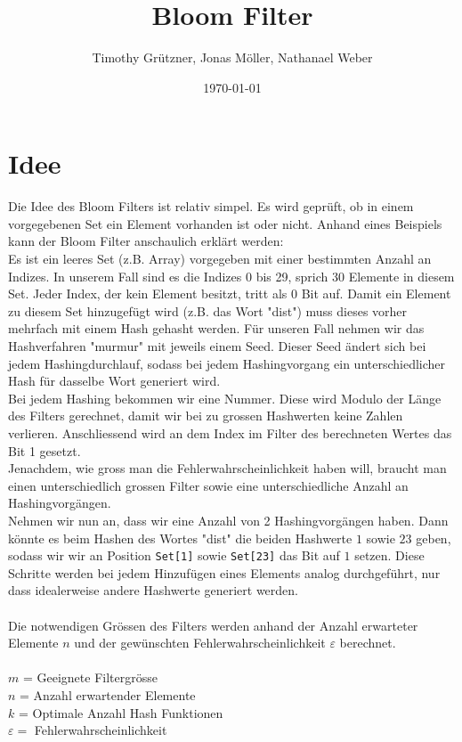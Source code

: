 \documentclass{article}
\title{Bloom Filter}
\author{Timothy Grützner, Jonas Möller, Nathanael Weber }
\date{\today}
\begin{document}
    \maketitle
    \newpage


    \section{Idee}
    Die Idee des Bloom Filters ist relativ simpel. Es wird geprüft, ob in einem vorgegebenen Set ein Element vorhanden ist oder nicht. Anhand eines Beispiels kann der Bloom Filter anschaulich erklärt werden:\\ Es ist ein leeres Set (z.B. Array) vorgegeben mit einer bestimmten Anzahl an Indizes. In unserem Fall sind es die Indizes 0 bis 29, sprich 30 Elemente in diesem Set. Jeder Index, der kein Element besitzt, tritt als 0 Bit auf.
    Damit ein Element zu diesem Set hinzugefügt wird (z.B. das Wort "dist") muss dieses vorher mehrfach mit einem Hash gehasht werden. Für unseren Fall nehmen wir das Hashverfahren "murmur" mit jeweils einem Seed. Dieser Seed ändert sich bei jedem Hashingdurchlauf, sodass bei jedem Hashingvorgang ein unterschiedlicher Hash für dasselbe Wort generiert wird. \\
    Bei jedem Hashing bekommen wir eine Nummer. Diese wird Modulo der Länge des Filters gerechnet, damit wir bei zu grossen Hashwerten keine Zahlen verlieren. Anschliessend wird an dem Index im Filter des berechneten Wertes das Bit 1 gesetzt. \\
    Jenachdem, wie gross man die Fehlerwahrscheinlichkeit haben will, braucht man einen unterschiedlich grossen Filter sowie eine unterschiedliche Anzahl an Hashingvorgängen. \\
    Nehmen wir nun an, dass wir eine Anzahl von 2 Hashingvorgängen haben. Dann könnte es beim Hashen des Wortes "dist" die beiden Hashwerte $1$ sowie $23$ geben, sodass wir wir an Position \verb|Set[1]| sowie \verb|Set[23]| das Bit auf $1$ setzen. Diese Schritte werden bei jedem Hinzufügen eines Elements analog durchgeführt, nur dass idealerweise andere Hashwerte generiert werden.\\\\
    Die notwendigen Grössen des Filters werden anhand der Anzahl erwarteter Elemente $n$ und der gewünschten Fehlerwahrscheinlichkeit $\varepsilon$ berechnet.\\\\
    $m$ = Geeignete Filtergrösse\\
    $n$ = Anzahl erwartender Elemente\\
    $k$ = Optimale Anzahl Hash Funktionen\\
    \noindent $\varepsilon = $ Fehlerwahrscheinlichkeit
    \\
\end{document}
